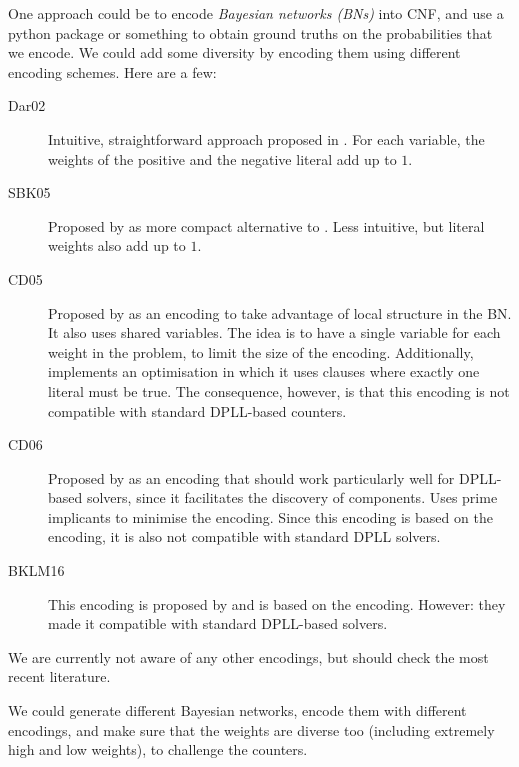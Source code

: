 \documentclass[a4paper]{tufte-handout}
\begin{document}
	One approach could be to encode {\em Bayesian networks (BNs)} into CNF, and use a python package or something to obtain ground truths on the probabilities that we encode.
	We could add some diversity by encoding them using different encoding schemes.
	Here are a few:
	\begin{description}
		\item[Dar02] Intuitive, straightforward approach proposed in \citep{Dar02}\cite{Dar02}. For each variable, the weights of the positive and the negative literal add up to $1$.
		\item[SBK05] Proposed by \citep{SBK05b}\cite{SBK05b} as more compact alternative to \darohtwo{}. Less intuitive, but literal weights also add up to $1$.
		\item[CD05] Proposed by \citep{CD05}\cite{CD05} as an encoding to take advantage of local structure in the BN. It also uses shared variables. The idea is to have a single variable for each weight in the problem, to limit the size of the encoding. Additionally, \citep{CD05} implements an optimisation in which it uses clauses where exactly one literal must be true. The consequence, however, is that this encoding is not compatible with standard DPLL-based counters.
		\item[CD06] Proposed by \citep{CD06}\cite{CD06} as an encoding that should work particularly well for DPLL-based solvers, since it facilitates the discovery of components. Uses prime implicants to minimise the encoding. Since this encoding is based on the \cdohfive{} encoding, it is also not compatible with standard DPLL solvers.
		\item[BKLM16] This encoding is proposed by \citep{BKL+16}\cite{BKL+16} and is based on the \cdohsix{} encoding. However: they made it compatible with standard DPLL-based solvers.
	\end{description}

	We are currently not aware of any other encodings, but should check the most recent literature.
	
	
	We could generate different Bayesian networks, encode them with different encodings, and make sure that the weights are diverse too (including extremely high and low weights), to challenge the counters.
	
\end{document}
